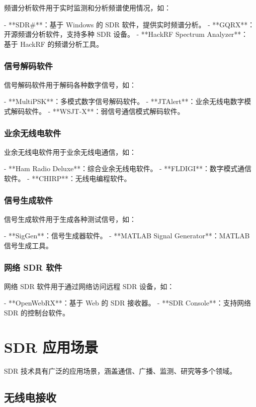 \documentclass[UTF8]{ctexbook}
\begin{document}
频谱分析软件用于实时监测和分析频谱使用情况，如：

- **SDR\#**：基于 Windows 的 SDR 软件，提供实时频谱分析。
- **GQRX**：开源频谱分析软件，支持多种 SDR 设备。
- **HackRF Spectrum Analyzer**：基于 HackRF 的频谱分析工具。

\subsection{信号解码软件}

信号解码软件用于解码各种数字信号，如：

- **MultiPSK**：多模式数字信号解码软件。
- **JTAlert**：业余无线电数字模式解码软件。
- **WSJT-X**：弱信号通信模式解码软件。

\subsection{业余无线电软件}

业余无线电软件用于业余无线电通信，如：

- **Ham Radio Deluxe**：综合业余无线电软件。
- **FLDIGI**：数字模式通信软件。
- **CHIRP**：无线电编程软件。

\subsection{信号生成软件}

信号生成软件用于生成各种测试信号，如：

- **SigGen**：信号生成器软件。
- **MATLAB Signal Generator**：MATLAB 信号生成工具。

\subsection{网络 SDR 软件}

网络 SDR 软件用于通过网络访问远程 SDR 设备，如：

- **OpenWebRX**：基于 Web 的 SDR 接收器。
- **SDR Console**：支持网络 SDR 的控制台软件。

\chapter{SDR 应用场景}

SDR 技术具有广泛的应用场景，涵盖通信、广播、监测、研究等多个领域。

\section{无线电接收}
\end{document}
